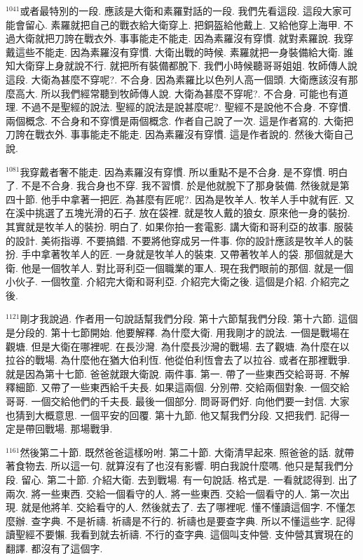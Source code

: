 \documentclass{book}
\begin{document}
$^{1041}$或者最特別的一段.
應該是大衛和素羅對話的一段.
我們先看這段.
這段大家可能會留心.
素羅就把自己的戰衣給大衛穿上.
把銅盔給他戴上.
又給他穿上海甲.
不過大衛就把刀誇在戰衣外.
事事能走不能走.
因為素羅沒有穿慣.
就對素羅說.
我穿戴這些不能走.
因為素羅沒有穿慣.
大衛出戰的時候.
素羅就把一身裝備給大衛.
誰知大衛穿上身就說不行.
就把所有裝備都脫下.
我們小時候聽哥哥姐姐.
牧師傳人說這段.
大衛為甚麼不穿呢?.
不合身.
因為素羅比以色列人高一個頭.
大衛應該沒有那麼高大.
所以我們經常聽到牧師傳人說.
大衛為甚麼不穿呢?.
不合身.
可能也有道理.
不過不是聖經的說法.
聖經的說法是說甚麼呢?.
聖經不是說他不合身.
不穿慣.
兩個概念.
不合身和不穿慣是兩個概念.
作者自己說了一次.
這是作者寫的.
大衛把刀誇在戰衣外.
事事能走不能走.
因為素羅沒有穿慣.
這是作者說的.
然後大衛自己說.

$^{1081}$我穿戴者奢不能走.
因為素羅沒有穿慣.
所以重點不是不合身.
是不穿慣.
明白了.
不是不合身.
我合身也不穿.
我不習慣.
於是他就脫下了那身裝備.
然後就是第四十節.
他手中拿著一把匠.
為甚麼有匠呢?.
因為是牧羊人.
牧羊人手中就有匠.
又在溪中挑選了五塊光滑的石子.
放在袋裡.
就是牧人戴的狼女.
原來他一身的裝扮.
其實就是牧羊人的裝扮.
明白了.
如果你拍一套電影.
講大衛和哥利亞的故事.
服裝的設計.
美術指導.
不要搞錯.
不要將他穿成另一件事.
你的設計應該是牧羊人的裝扮.
手中拿著牧羊人的匠.
一身就是牧羊人的裝束.
又帶著牧羊人的袋.
那個就是大衛.
他是一個牧羊人.
對比哥利亞一個職業的軍人.
現在我們眼前的那個.
就是一個小伙子.
一個牧童.
介紹完大衛和哥利亞.
介紹完大衛之後.
這個是介紹.
介紹完之後.

$^{1121}$剛才我說過.
作者用一句說話幫我們分段.
第十六節幫我們分段.
第十六節.
這個是分段的.
第十七節開始.
他要解釋.
為什麼大衛.
用我剛才的說法.
一個是戰場在觀塘.
但是大衛在哪裡呢.
在長沙灣.
為什麼長沙灣的戰場.
去了觀塘.
為什麼在以拉谷的戰場.
為什麼他在猶大伯利恆.
他從伯利恆會去了以拉谷.
或者在那裡戰爭.
就是因為第十七節.
爸爸就跟大衛說.
兩件事.
第一.
帶了一些東西交給哥哥.
不解釋細節.
又帶了一些東西給千夫長.
如果這兩個.
分別帶.
交給兩個對象.
一個交給哥哥.
一個交給他們的千夫長.
最後一個部分.
問哥哥們好.
向他們要一封信.
大家也猜到大概意思.
一個平安的回覆.
第十九節.
他又幫我們分段.
又把我們.
記得一定是帶回戰場.
那場戰爭.

$^{1161}$然後第二十節.
既然爸爸這樣吩咐.
第二十節.
大衛清早起來.
照爸爸的話.
就帶著食物去.
所以這一句.
就算沒有了也沒有影響.
明白我說什麼嗎.
他只是幫我們分段.
留心.
第二十節.
介紹大衛.
去到戰場.
有一句說話.
格式是.
一看就認得到.
出了兩次.
將一些東西.
交給一個看守的人.
將一些東西.
交給一個看守的人.
第一次出現.
就是他將羊.
交給看守的人.
然後就去了.
去了哪裡呢.
懂不懂讀這個字.
不懂怎麼辦.
查字典.
不是祈禱.
祈禱是不行的.
祈禱也是要查字典.
所以不懂這些字.
記得讀聖經不要懶.
我看到就去祈禱.
不行的查字典.
這個叫支仲營.
支仲營其實現在的翻譯.
都沒有了這個字.
\end{document}
